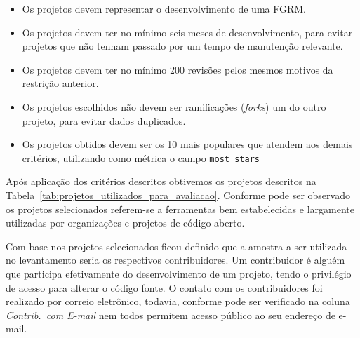 \begin{itemize}
	\item Os projetos devem representar o desenvolvimento de uma FGRM\@.
	\item Os projetos devem ter no mínimo seis meses de desenvolvimento, para
		evitar projetos que não tenham passado por um tempo de manutenção
		relevante.
	\item Os  projetos devem  ter  no  mínimo  200  revisões  pelos  mesmos
		motivos  da restrição anterior.
	\item Os projetos escolhidos não devem ser ramificações (\textsl{forks}) um
		do outro projeto, para evitar dados duplicados.
	\item Os projetos obtidos devem ser os 10 mais populares que atendem aos
		demais critérios, utilizando como métrica o campo \texttt{most stars}
\end{itemize}

Após aplicação dos critérios descritos obtivemos os projetos descritos na
Tabela~\ref{tab:projetos_utilizados_para_avaliacao}. Conforme pode ser observado
os projetos selecionados referem-se a ferramentas bem estabelecidas e largamente
utilizadas por organizações e projetos de código aberto.

\begin{table}[htpb]
\centering
{}
\caption{Projetos utilizados no levantamento com profissionais. Os dados
	apresentados tem como referência 07/03/2017.}
\label{tab:projetos_utilizados_para_avaliacao}
\end{table}


Com base nos projetos selecionados ficou definido que a amostra a ser utilizada
no levantamento seria os respectivos contribuidores. Um contribuidor é alguém
que participa efetivamente do desenvolvimento de um projeto, tendo o privilégio
de acesso para alterar o código fonte. O contato com os contribuidores foi
realizado por correio eletrônico, todavia, conforme pode ser verificado na
coluna \textit{Contrib.\ com E-mail} nem todos permitem acesso público ao seu
endereço de e-mail.


